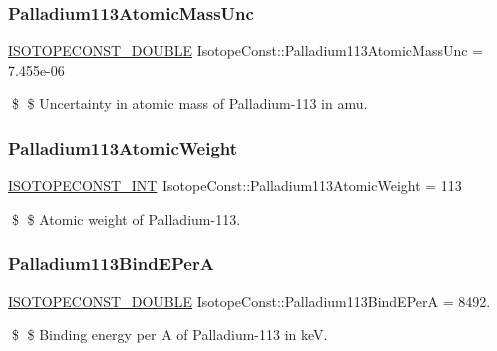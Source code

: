 \subsubsection{\texorpdfstring{Palladium113\+Atomic\+Mass\+Unc}{Palladium113AtomicMassUnc}}
{\footnotesize\ttfamily \mbox{\hyperlink{group___isotope_const-_macros_ga8f45a7272ce02c0b4c65c44636ed719a}{I\+S\+O\+T\+O\+P\+E\+C\+O\+N\+S\+T\+\_\+\+D\+O\+U\+B\+LE}} Isotope\+Const\+::\+Palladium113\+Atomic\+Mass\+Unc = 7.\+455e-\/06}

\$ \$ Uncertainty in atomic mass of Palladium-\/113 in amu. \mbox{\label{group___isotope_const-_palladium-_pd113_gac5de831ca97a2f1db1a06e5aca3cde0e}} 
\subsubsection{\texorpdfstring{Palladium113\+Atomic\+Weight}{Palladium113AtomicWeight}}
{\footnotesize\ttfamily \mbox{\hyperlink{group___isotope_const-_macros_ga5f18360b3e99483a35c32d789e62621c}{I\+S\+O\+T\+O\+P\+E\+C\+O\+N\+S\+T\+\_\+\+I\+NT}} Isotope\+Const\+::\+Palladium113\+Atomic\+Weight = 113}

\$ \$ Atomic weight of Palladium-\/113. \mbox{\label{group___isotope_const-_palladium-_pd113_ga7ba8543cf51f3d80ada9d4999f4f032b}} 
\subsubsection{\texorpdfstring{Palladium113\+Bind\+E\+PerA}{Palladium113BindEPerA}}
{\footnotesize\ttfamily \mbox{\hyperlink{group___isotope_const-_macros_ga8f45a7272ce02c0b4c65c44636ed719a}{I\+S\+O\+T\+O\+P\+E\+C\+O\+N\+S\+T\+\_\+\+D\+O\+U\+B\+LE}} Isotope\+Const\+::\+Palladium113\+Bind\+E\+PerA = 8492.}

\$ \$ Binding energy per A of Palladium-\/113 in keV. \mbox{\label{group___isotope_const-_palladium-_pd113_gab1a880e94f8cdb0ad753f99f4b9631b3}} 
